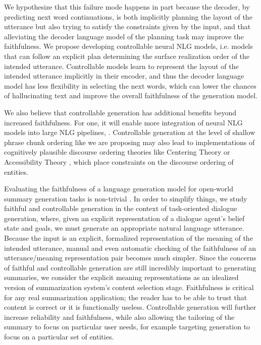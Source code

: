 We hypothesize that this failure mode happens in part because the decoder, by
predicting next word continuations, is both implicitly planning the layout of
the utterance but also trying to satisfy the constraints given by the input,
and that alleviating the decoder language model of the planning task may
improve the faithfulness.  We propose developing controllable neural NLG
models, i.e. models that can follow an explicit plan determining  the surface
realization order of the intended utterance.  Controllable models learn to
represent the layout of the intended utterance implicitly in their encoder, and
thus the decoder language model has less flexibility in selecting the next
words, which can lower the chances of hallucinating text and improve the
overall faithfulness of the generation model.

We also believe that controllable generation has additional benefits beyond
increased faithfulness. For one, it will enable more integration of neural NLG
models into large NLG pipelines, \citep{castroferreira2019}.  Controllable
generation at the level of shallow phrase chunk ordering like we are proposing
may also lead to implementations of cognitively plausible discourse ordering
theories like Centering Theory \citep{grosz1995} or Accessibility Theory
\citep{ariel2001}, which place constraints on the discourse ordering of
entities.

Evaluating the faithfulness of a language generation model for open-world
summary generation tasks is non-trivial \citep{kryscinski2020,maynez2020}. In
order to simplify things, we study faithful and controllable generation in the
context of task-oriented dialogue generation, where, given an explicit
representation of a dialogue agent's belief state and goals, we must generate
an appropriate natural language utterance. Because the input is an explicit,
formalized representation of the meaning of the intended utterance, manual and
even automatic checking of the faithfulness of an utterance/meaning
representation pair becomes much simpler. Since the concerns of faithful and
controllable generation are still incredibly important to generating summaries,
we consider the explicit meaning representations as an idealized version of
summarization system's content selection stage.  Faithfulness is critical for
any real summarization application; the reader has to be able to trust that
content is correct or it is functionally useless. Controllable generation will
further increase reliability and faithfulness, while also allowing the
tailoring of the summary to focus on particular user needs, for example
targeting generation to focus on a particular set of entities. 
      
